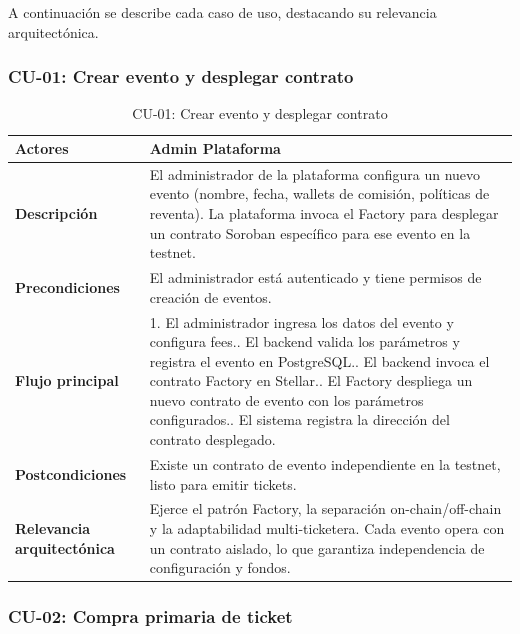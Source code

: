 \documentclass[12pt,oneside]{article}
\begin{document}
A continuación se describe cada caso de uso, destacando su relevancia arquitectónica.

\clearpage
\subsubsection{CU-01: Crear evento y desplegar contrato}

\begin{table}[h!]
  \centering
  \begin{tabularx}{\textwidth}{@{}p{3.5cm} X@{}}
    \toprule
    \textbf{Actores} & Admin Plataforma\\
    \midrule
    \textbf{Descripción} & El administrador de la plataforma configura un nuevo evento (nombre, fecha, wallets de comisión, políticas de reventa). La plataforma invoca el Factory para desplegar un contrato Soroban específico para ese evento en la testnet.\\
    \midrule
    \textbf{Precondiciones} & El administrador está autenticado y tiene permisos de creación de eventos.\\
    \midrule
    \textbf{Flujo principal} &
      1. El administrador ingresa los datos del evento y configura fees.\newline
      2. El backend valida los parámetros y registra el evento en PostgreSQL.\newline
      3. El backend invoca el contrato Factory en Stellar.\newline
      4. El Factory despliega un nuevo contrato de evento con los parámetros configurados.\newline
      5. El sistema registra la dirección del contrato desplegado.\\
    \midrule
    \textbf{Postcondiciones} & Existe un contrato de evento independiente en la testnet, listo para emitir tickets.\\
    \midrule
    \textbf{Relevancia arquitectónica} & Ejerce el patrón Factory, la separación on-chain/off-chain y la adaptabilidad multi-ticketera. Cada evento opera con un contrato aislado, lo que garantiza independencia de configuración y fondos.\\
    \bottomrule
  \end{tabularx}
  \caption{CU-01: Crear evento y desplegar contrato}
  \label{tab:cu01}
\end{table}

\clearpage
\subsubsection{CU-02: Compra primaria de ticket}
\end{document}
